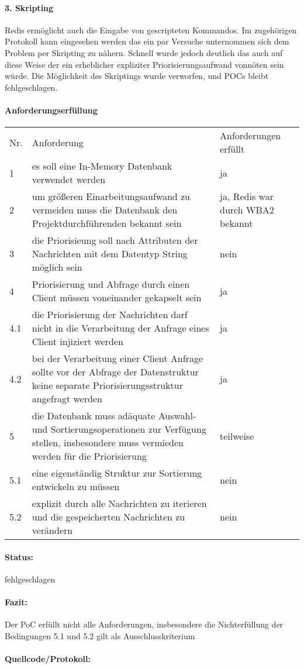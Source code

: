 \documentclass[11pt,oneside,a4paper,notitlepage]{article}
\begin{document}
\paragraph*{3. Skripting}
Redis ermöglicht auch die Eingabe von gescripteten Kommandos. Im zugehörigen Protokoll kann eingesehen werden das ein par Versuche unternommen sich dem Problem per Skripting zu nähern. Schnell wurde jedoch deutlich das auch auf diese Weise der ein erheblicher expliziter Priorisierungsaufwand vonnöten sein würde. Die Möglichkeit des Skriptings wurde verworfen, und POCs bleibt fehlgeschlagen.


\paragraph*{Anforderungserfüllung}
\begin{center}
\begin{tabular}{| p{20mm} | p{80mm} | p{60mm} |}
\hline
Nr. & Anforderung & Anforderungen erfüllt\\
1 & es soll eine In-Memory Datenbank verwendet werden & ja \\
2 & um größeren Einarbeitungsaufwand zu vermeiden muss die Datenbank den Projektdurchführenden bekannt sein & ja, Redis war durch WBA2 bekannt \\
3 & die Priorisieung soll nach Attributen der Nachrichten mit dem Datentyp String möglich sein & nein\\
4 & Priorisierung und Abfrage durch einen Client müssen voneinander gekapselt sein & ja\\
4.1 & die Priorisierung der Nachrichten darf nicht in die Verarbeitung der Anfrage eines Client injiziert werden & ja \\
4.2 & bei der Verarbeitung einer Client Anfrage sollte vor der Abfrage der Datenstruktur keine separate Priorisierungsstruktur angefragt werden & ja\\
5 & die Datenbank muss adäquate Auswahl- und Sortierungsoperationen zur Verfügung stellen, insbesondere muss vermieden werden für die Priorisierung & teilweise \\
5.1 & eine eigenständig Struktur zur Sortierung entwickeln zu müssen & nein \\
5.2 & explizit durch alle Nachrichten zu iterieren und die gespeicherten Nachrichten zu verändern & nein \\
\hline
\end{tabular}
\end{center}
%
\paragraph*{Status:} fehlgeschlagen
\paragraph*{Fazit:} Der PoC erfüllt nicht alle Anforderungen, insbesondere die Nichterfüllung der Bedingungen 5.1 und 5.2 gilt als Ausschlusskriterium
\paragraph*{Quellcode/Protokoll: } \href{}{}
\end{document}
